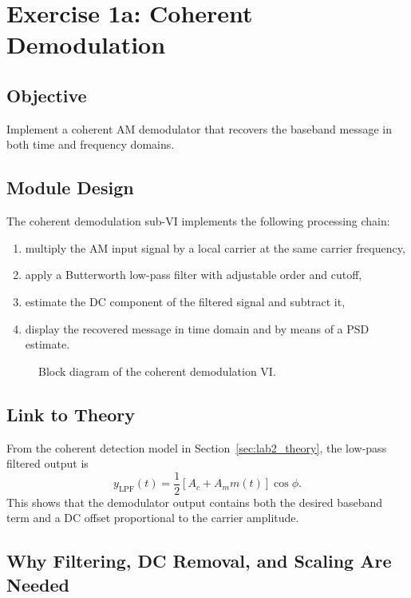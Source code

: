 \section{Exercise 1a: Coherent Demodulation}
\label{sec:lab2_ex1a}

\subsection{Objective}

Implement a coherent AM demodulator that recovers the baseband message in both
time and frequency domains.

\subsection{Module Design}

The coherent demodulation sub-VI implements the following processing chain:
\begin{enumerate}
\item multiply the AM input signal by a local carrier at the same carrier
frequency,
\item apply a Butterworth low-pass filter with adjustable order and cutoff,
\item estimate the DC component of the filtered signal and subtract it,
\item display the recovered message in time domain and by means of a PSD
estimate.
\end{enumerate}

\begin{figure}[H]
\centering
{}
\caption{Block diagram of the coherent demodulation VI.}
\label{fig:lab2_coherent_vi}
\end{figure}

\subsection{Link to Theory}

From the coherent detection model in
Section~\ref{sec:lab2_theory}, the low-pass filtered output is
\begin{equation}
y_{\mathrm{LPF}}(t)=\frac{1}{2}\left[A_c + A_m m(t)\right]\cos\phi.
\end{equation}
This shows that the demodulator output contains both the desired baseband term
and a DC offset proportional to the carrier amplitude.

\subsection{Why Filtering, DC Removal, and Scaling Are Needed}

